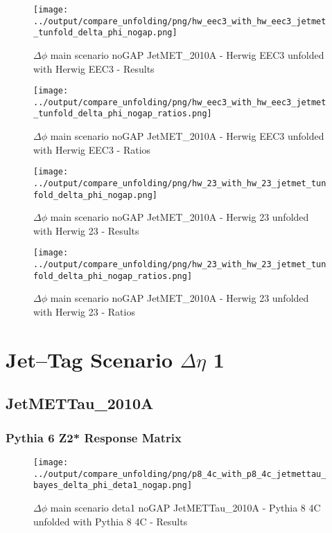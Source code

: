\documentclass[11pt]{book}
\begin{document}
\begin{figure}[ht]
\centering
\texttt{[image: ../output/compare\_unfolding/png/hw\_eec3\_with\_hw\_eec3\_jetmet\_tunfold\_delta\_phi\_nogap.png]}
\caption{$\Delta\phi$ main scenario noGAP JetMET\_2010A - Herwig EEC3 unfolded with Herwig EEC3 - Results}
\label{hw_eec3_hw_eec3_jetmet_tunfold_delta_phi_nogap_a}
\end{figure}

\begin{figure}[ht]
\centering
\texttt{[image: ../output/compare\_unfolding/png/hw\_eec3\_with\_hw\_eec3\_jetmet\_tunfold\_delta\_phi\_nogap\_ratios.png]}
\caption{$\Delta\phi$ main scenario noGAP JetMET\_2010A - Herwig EEC3 unfolded with Herwig EEC3 - Ratios}
\label{hw_eec3_hw_eec3_jetmet_tunfold_delta_phi_nogap_b}
\end{figure}

\begin{figure}[ht]
\centering
\texttt{[image: ../output/compare\_unfolding/png/hw\_23\_with\_hw\_23\_jetmet\_tunfold\_delta\_phi\_nogap.png]}
\caption{$\Delta\phi$ main scenario noGAP JetMET\_2010A - Herwig 23 unfolded with Herwig 23 - Results}
\label{hw_23_hw_23_jetmet_tunfold_delta_phi_nogap_a}
\end{figure}

\begin{figure}[ht]
\centering
\texttt{[image: ../output/compare\_unfolding/png/hw\_23\_with\_hw\_23\_jetmet\_tunfold\_delta\_phi\_nogap\_ratios.png]}
\caption{$\Delta\phi$ main scenario noGAP JetMET\_2010A - Herwig 23 unfolded with Herwig 23 - Ratios}
\label{hw_23_hw_23_jetmet_tunfold_delta_phi_nogap_b}
\end{figure}




\newpage
\chapter{Jet--Tag Scenario $\Delta\eta$ 1}
\section{JetMETTau\_2010A}
\subsection{Pythia 6 Z2* Response Matrix}



\begin{figure}[ht]
\centering
\texttt{[image: ../output/compare\_unfolding/png/p8\_4c\_with\_p8\_4c\_jetmettau\_bayes\_delta\_phi\_deta1\_nogap.png]}
\caption{$\Delta\phi$ main scenario deta1 noGAP JetMETTau\_2010A - Pythia 8 4C unfolded with Pythia 8 4C - Results}
\label{p8_p8_jetmettau_bayes_delta_phi_deta1_nogap_a}
\end{figure}
\end{document}
